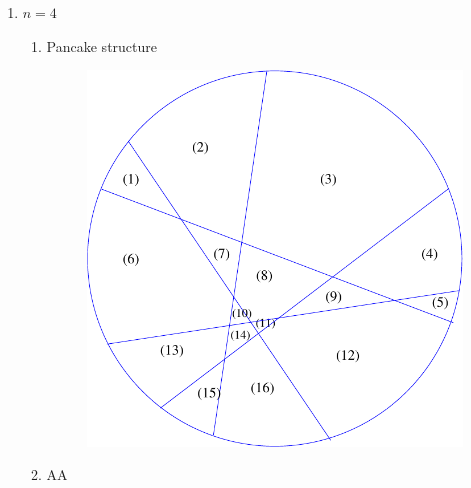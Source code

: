 \documentclass[a4paper,10pt]{article}
\begin{document}
\begin{enumerate}
\begin{enumerate}
  \end{enumerate}
  \item $n = 4$\\
  \begin{enumerate}
    \item Pancake structure\\
      \begin{figure}[h!]
			\includegraphics[scale=0.3]{graphics/pancakecut16}
			\captionsetup{labelformat=empty}
			\caption{}
			\label{fig:pancakecut16}
		\end{figure}
    \item AA\\
      
  \end{enumerate}
\end{enumerate}
\end{document}
